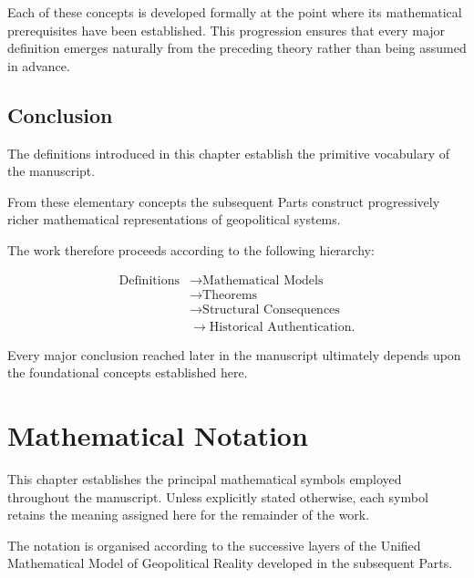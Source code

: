 \documentclass[11pt,openany]{book}
\theoremstyle{plain}
\theoremstyle{definition}
\begin{document}
Each of these concepts is developed formally at the point where its mathematical prerequisites have been established. This progression ensures that every major definition emerges naturally from the preceding theory rather than being assumed in advance.


\section*{Conclusion}

The definitions introduced in this chapter establish the primitive vocabulary of the manuscript.

From these elementary concepts the subsequent Parts construct progressively richer mathematical representations of geopolitical systems.

The work therefore proceeds according to the following hierarchy:

\[
\boxed{
\begin{aligned}
\text{Definitions}
&\longrightarrow
\text{Mathematical Models}
\\
&\longrightarrow
\text{Theorems}
\\
&\longrightarrow
\text{Structural Consequences}
\\
&\longrightarrow
\text{Historical Authentication}.
\end{aligned}
}
\]

Every major conclusion reached later in the manuscript ultimately depends upon the foundational concepts established here.

\chapter*{Mathematical Notation}


This chapter establishes the principal mathematical symbols employed throughout the manuscript. Unless explicitly stated otherwise, each symbol retains the meaning assigned here for the remainder of the work.

The notation is organised according to the successive layers of the Unified Mathematical Model of Geopolitical Reality developed in the subsequent Parts.

\end{document}
